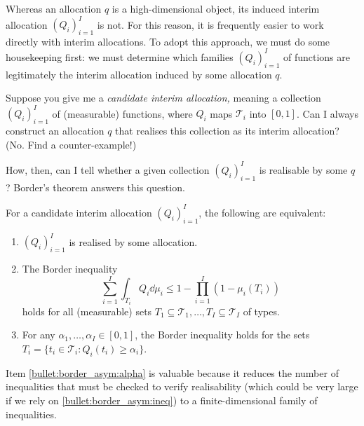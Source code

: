 Whereas an allocation $q$ is a high-dimensional object,
its induced interim allocation $(Q_i)_{i=1}^I$ is not.
For this reason, it is frequently easier to work directly with interim allocations.
To adopt this approach, we must do some housekeeping first:
we must determine which families $(Q_i)_{i=1}^I$ of functions
are legitimately the interim allocation induced by some allocation $q$.

Suppose you give me a \emph{candidate interim allocation,}
meaning a collection $(Q_i)_{i=1}^I$ of (measurable) functions, where $Q_i$ maps $\mathcal{T}_i$ into $[0,1]$.
Can I always construct an allocation $q$ that realises this collection as its interim allocation?
(No. Find a counter-example!)

How, then, can I tell whether a given collection $(Q_i)_{i=1}^I$ is realisable by some $q$? Border's theorem answers this question.


\begin{namedthm}
	\label{theorem:border_asym}
	For a candidate interim allocation $(Q_i)_{i=1}^I$,
	the following are equivalent:
	\begin{enumerate}
	
		\item \label{bullet:border_asym:real}
		$(Q_i)_{i=1}^I$ is realised by some allocation.

		\item \label{bullet:border_asym:ineq}
		The Border inequality
		\begin{equation*}
			\sum_{i=1}^I \int_{T_i} Q_i \dd \mu_i
			\leq 1 - \prod_{i=1}^I \left( 1 - \mu_i(T_i) \right)
		\end{equation*}
		holds for all (measurable) sets $T_1 \subseteq \mathcal{T}_1, \dots, T_I \subseteq \mathcal{T}_I$ of types.

		\item \label{bullet:border_asym:alpha}
		For any $\alpha_1,\dots,\alpha_I \in [0,1]$,
		the Border inequality holds for the sets $T_i = \{ t_i \in \mathcal{T}_i : Q_i(t_i) \geq \alpha_i \}$.
	
	\end{enumerate}
\end{namedthm}


Item \ref{bullet:border_asym:alpha} is valuable because it reduces the number of inequalities that must be checked to verify realisability (which could be very large if we rely on \ref{bullet:border_asym:ineq})
to a finite-dimensional family of inequalities.

